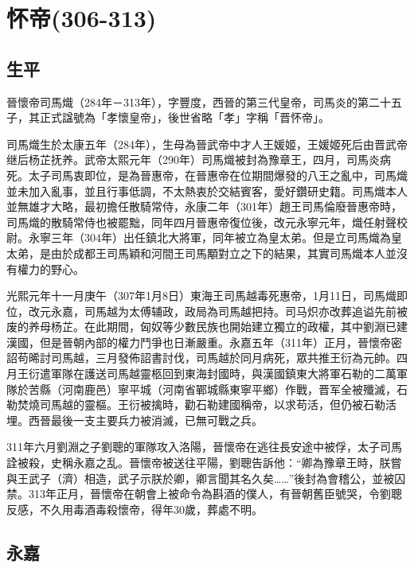 
\section{怀帝\tiny(306-313)}

\subsection{生平}

晉懷帝司馬熾（284年－313年），字豐度，西晉的第三代皇帝，司馬炎的第二十五子，其正式諡號為「孝懷皇帝」，後世省略「孝」字稱「晋怀帝」。

司馬熾生於太康五年（284年），生母為晉武帝中才人王媛姬，王媛姬死后由晋武帝继后杨芷抚养。武帝太熙元年（290年）司馬熾被封為豫章王，四月，司馬炎病死。太子司馬衷即位，是為晉惠帝，在晉惠帝在位期間爆發的八王之亂中，司馬熾並未加入亂事，並且行事低調，不太熱衷於交結賓客，愛好鑽研史籍。司馬熾本人並無雄才大略，最初擔任散騎常侍，永康二年（301年）趙王司馬倫廢晉惠帝時，司馬熾的散騎常侍也被罷黜，同年四月晉惠帝復位後，改元永寧元年，熾任射聲校尉。永寧三年（304年）出任鎮北大將軍，同年被立為皇太弟。但是立司馬熾為皇太弟，是由於成都王司馬穎和河間王司馬顒對立之下的結果，其實司馬熾本人並沒有權力的野心。

光熙元年十一月庚午（307年1月8日）東海王司馬越毒死惠帝，1月11日，司馬熾即位，改元永嘉，司馬越为太傅辅政，政局為司馬越把持。司马炽亦改葬追谥先前被废的养母杨芷。在此期間，匈奴等少數民族也開始建立獨立的政權，其中劉淵已建漢國，但是晉朝內部的權力鬥爭也日漸嚴重。永嘉五年（311年）正月，晉懷帝密詔苟晞討司馬越，三月發佈詔書討伐，司馬越於同月病死，眾共推王衍為元帥。四月王衍遣軍隊在護送司馬越靈柩回到東海封國時，與漢國鎮東大將軍石勒的二萬軍隊於苦縣（河南鹿邑）寧平城（河南省鄲城縣東寧平鄉）作戰，晋军全被殲滅，石勒焚燒司馬越的靈樞。王衍被擒時，勸石勒建國稱帝，以求苟活，但仍被石勒活埋。西晉最後一支主要兵力被消滅，已無可戰之兵。

311年六月劉淵之子劉聰的軍隊攻入洛陽，晉懷帝在逃往長安途中被俘，太子司馬詮被殺，史稱永嘉之乱。晉懷帝被送往平陽，劉聰告訴他：“卿為豫章王時，朕嘗與王武子（濟）相造，武子示朕於卿，卿言聞其名久矣……”後封為會稽公，並被囚禁。313年正月，晉懷帝在朝會上被命令為斟酒的僕人，有晉朝舊臣號哭，令劉聰反感，不久用毒酒毒殺懷帝，得年30歲，葬處不明。

\subsection{永嘉}

